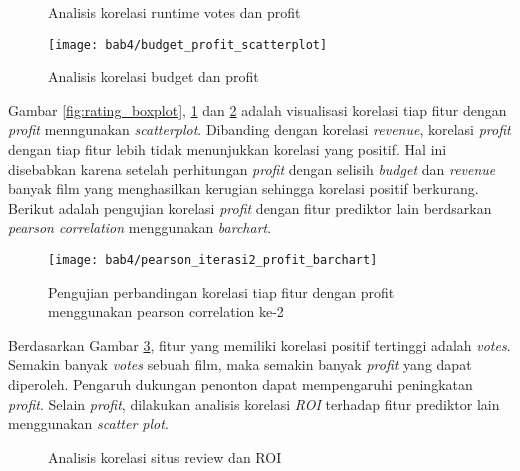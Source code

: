 \begin{figure}[H]
    \centering
    \qquad
    \caption{Analisis korelasi runtime votes dan profit}%
    \label{fig:runtime_votes_profit_scatterplot}%
\end{figure}

\begin{figure}[H]
	\centering  
	\texttt{[image: bab4/budget\_profit\_scatterplot]}   
	\caption{Analisis korelasi budget dan profit }
	\label{fig:budget_profit_scatterplot} 
\end{figure} 



Gambar \ref{fig:rating_boxplot}, \ref{fig:runtime_votes_profit_scatterplot} dan \ref{fig:budget_profit_scatterplot} adalah visualisasi korelasi tiap fitur dengan \textit{profit} menngunakan \textit{scatterplot}. Dibanding dengan korelasi \textit{revenue}, korelasi \textit{profit} dengan tiap fitur lebih tidak menunjukkan korelasi yang positif. Hal ini disebabkan karena setelah perhitungan \textit{profit} dengan selisih \textit{budget} dan \textit{revenue} banyak film yang menghasilkan kerugian sehingga korelasi positif berkurang. Berikut adalah pengujian korelasi \textit{profit} dengan fitur prediktor lain berdsarkan \textit{pearson correlation} menggunakan \textit{barchart}. 


\begin{figure}[H]
	\centering  
	\texttt{[image: bab4/pearson\_iterasi2\_profit\_barchart]}   
	\caption{Pengujian perbandingan korelasi tiap fitur dengan profit menggunakan pearson correlation ke-2}
	\label{fig:pearson_iterasi2_profit_barchart} 
\end{figure} 

Berdasarkan Gambar \ref{fig:pearson_iterasi2_profit_barchart}, fitur yang memiliki korelasi positif tertinggi adalah \textit{votes}. Semakin banyak \textit{votes} sebuah film, maka semakin banyak \textit{profit} yang dapat diperoleh. Pengaruh dukungan penonton dapat mempengaruhi peningkatan \textit{profit}. Selain \textit{profit}, dilakukan analisis korelasi \textit{ROI} terhadap fitur prediktor lain menggunakan \textit{scatter plot}. 


\begin{figure}[H]
    \centering
    \qquad
    \caption{Analisis korelasi situs review dan ROI}%
    \label{fig:rating_metascore_roi_scatterplot}%
\end{figure}



